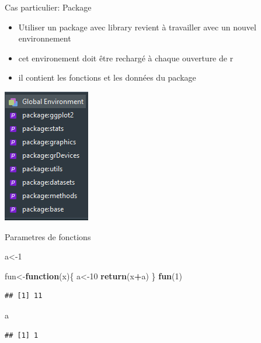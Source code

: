 \documentclass[
  ignorenonframetext,
]{beamer}
\newenvironment{Shaded}{\begin{snugshade}}{\end{snugshade}}
\newcommand{\ControlFlowTok}[1]{\textcolor[rgb]{0.13,0.29,0.53}{\textbf{#1}}}
\newcommand{\DecValTok}[1]{\textcolor[rgb]{0.00,0.00,0.81}{#1}}
\newcommand{\KeywordTok}[1]{\textcolor[rgb]{0.13,0.29,0.53}{\textbf{#1}}}
\newcommand{\NormalTok}[1]{#1}
\newcommand{\OperatorTok}[1]{\textcolor[rgb]{0.81,0.36,0.00}{\textbf{#1}}}
\providecommand{\tightlist}{%
  \setlength{\itemsep}{0pt}\setlength{\parskip}{0pt}}
\begin{document}
\begin{frame}{Cas particulier: Package}
\protect\hypertarget{cas-particulier-package}{}

\begin{itemize}
\tightlist
\item
  Utiliser un package avec library revient à travailler avec un nouvel
  environnement
\item
  cet environement doit être rechargé à chaque ouverture de r
\item
  il contient les fonctions et les données du package
\end{itemize}

\includegraphics{Captureenvir.PNG}

\end{frame}

\begin{frame}[fragile]{Parametres de fonctions}
\protect\hypertarget{parametres-de-fonctions}{}

\begin{Shaded}
\begin{Highlighting}[]
\NormalTok{a<-}\DecValTok{1}

\NormalTok{fun<-}\ControlFlowTok{function}\NormalTok{(x)\{}
\NormalTok{a<-}\DecValTok{10}
\KeywordTok{return}\NormalTok{(x}\OperatorTok{+}\NormalTok{a)}
\NormalTok{\}}
\KeywordTok{fun}\NormalTok{(}\DecValTok{1}\NormalTok{)}
\end{Highlighting}
\end{Shaded}

\begin{verbatim}
## [1] 11
\end{verbatim}

\begin{Shaded}
\begin{Highlighting}[]
\NormalTok{a}
\end{Highlighting}
\end{Shaded}

\begin{verbatim}
## [1] 1
\end{verbatim}

\end{frame}
\end{document}
